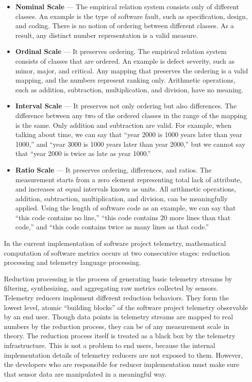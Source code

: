 \begin{itemize}
	\item \textbf{Nominal Scale} --- The empirical relation system consists only of different classes. An example is the type of software fault, such as specification, design, and coding. There is no notion of ordering between different classes. As a result, any distinct number representation is a valid measure.
	
	\item \textbf{Ordinal Scale} --- It preserves ordering. The empirical relation system consists of classes that are ordered. An example is defect severity, such as minor, major, and critical. Any mapping that preserves the ordering is a valid mapping, and the numbers represent ranking only. Arithmetic operations, such as addition, subtraction, multiplication, and division, have no meaning.
	
	\item \textbf{Interval Scale} --- It preserves not only ordering but also differences. The difference between any two of the ordered classes in the range of the mapping is the same. Only addition and subtraction are valid. For example, when talking about time, we can say that ``year 2000 is 1000 years later than year 1000,'' and ``year 3000 is 1000 years later than year 2000,'' but we cannot say that ``year 2000 is twice as late as year 1000.'' 
	
	\item \textbf{Ratio Scale} --- It preserves ordering, differences, and ratios. The measurement starts from a zero element representing total lack of attribute, and increases at equal intervals known as units. All arithmetic operations, addition, subtraction, multiplication, and division, can be meaningfully applied. Using the length of software code as an example, we can say that ``this code contains no line,'' ``this code contains 20 more lines than that code,'' and ``this code contains twice as many lines as that code.''

\end{itemize}


 

In the current implementation of software project telemetry, mathematical computation of software metrics occurs at two consecutive stages: reduction processing and telemetry language processing. 

Reduction processing is the process of generating basic telemetry streams by filtering, synthesizing, and aggregating raw metrics collected by sensors. Telemetry reducers implement different reduction behaviors. They form the lowest level, atomic ``building blocks'' of the software project telemetry observable by an end user. Though data points in telemetry streams are mapped to real numbers by the reduction process, they can be of any measurement scale in theory. The reduction process itself is treated as a black box by the telemetry infrastructure. This is not a problem to end users, because the internal implementation details of telemetry reducers are not exposed to them. However, the developers who are responsible for reducer implementation must make sure that sensor data are manipulated in a meaningful way.

